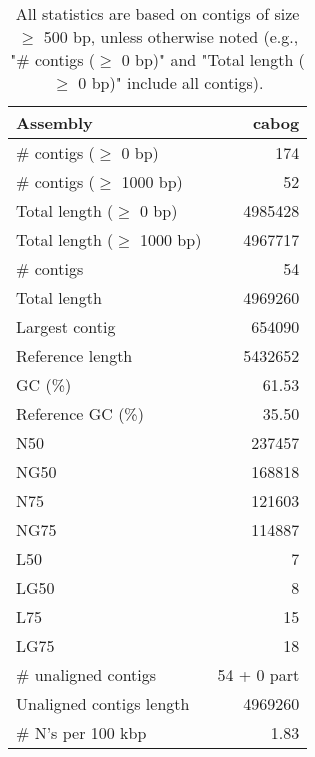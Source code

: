 \documentclass[12pt,a4paper]{article}
\begin{document}
\begin{table}[ht]
\begin{center}
\caption{All statistics are based on contigs of size $\geq$ 500 bp, unless otherwise noted (e.g., "\# contigs ($\geq$ 0 bp)" and "Total length ($\geq$ 0 bp)" include all contigs).}
\begin{tabular}{|l*{1}{|r}|}
\hline
Assembly & cabog \\ \hline
\# contigs ($\geq$ 0 bp) & 174 \\ \hline
\# contigs ($\geq$ 1000 bp) & 52 \\ \hline
Total length ($\geq$ 0 bp) & 4985428 \\ \hline
Total length ($\geq$ 1000 bp) & 4967717 \\ \hline
\# contigs & 54 \\ \hline
Total length & 4969260 \\ \hline
Largest contig & 654090 \\ \hline
Reference length & 5432652 \\ \hline
GC (\%) & 61.53 \\ \hline
Reference GC (\%) & 35.50 \\ \hline
N50 & 237457 \\ \hline
NG50 & 168818 \\ \hline
N75 & 121603 \\ \hline
NG75 & 114887 \\ \hline
L50 & 7 \\ \hline
LG50 & 8 \\ \hline
L75 & 15 \\ \hline
LG75 & 18 \\ \hline
\# unaligned contigs & 54 + 0 part \\ \hline
Unaligned contigs length & 4969260 \\ \hline
\# N's per 100 kbp & 1.83 \\ \hline
\end{tabular}
\end{center}
\end{table}
\end{document}
